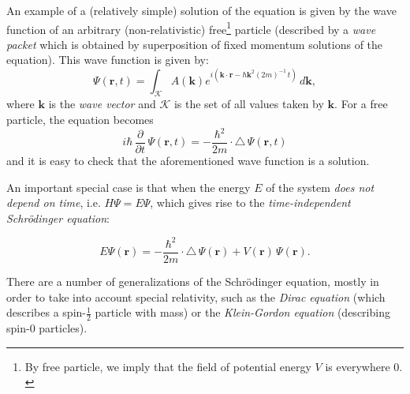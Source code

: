 \documentclass[12pt]{article}
\newcommand{\vect}[1]{\boldsymbol{#1}}
\begin{document}
An example of a (relatively simple) solution of the equation is given by the wave function of an arbitrary (non-relativistic) free\footnote{By free particle, we imply that the field of potential energy $V$ is everywhere $0.$} particle (described by a \emph{wave packet} which is obtained by superposition of fixed momentum solutions of the equation). This wave function is given by: 
\[ \Psi(\vect r, t) = \int_{\mathcal{K}} A(\vect k) e^{i(\vect k\cdot \vect r - \hbar\vect{k}^2(2m)^{-1}\,t)}\,d\vect k,\] where $\vect k$ is the \emph{wave vector} and $\mathcal{K}$ is the set of all values taken by $\vect k.$
For a free particle, the equation becomes
\[ i \hbar\, \frac{\partial}{\partial t}\,\Psi(\vect r, t) = - \frac{\hbar^2}{2m}\cdot \triangle\, \Psi(\vect r, t)\]
and it is easy to check that the aforementioned wave function is a solution.

An important special case is that when the energy $E$ of the system {\em does not depend on time}, i.e. $H\Psi = E\Psi$, which gives rise to the \emph{time-independent Schr\"odinger equation}: 

\[ E\Psi(\vect r) = - \frac{\hbar^2}{2m}\cdot \triangle\, \Psi(\vect r) + V(\vect r)\, \Psi(\vect r). \]

There are a number of generalizations of the Schr\"odinger equation, mostly in order to take into account special relativity, such as the \emph{Dirac equation} (which describes a spin-$\frac{1}{2}$ particle with mass) or the \emph{Klein-Gordon equation} (describing spin-$0$ particles).

\end{document}
